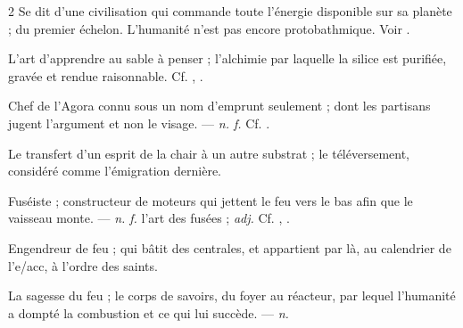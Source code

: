 \begin{multicols}{2}
 Se dit d'une civilisation qui commande toute l'énergie disponible sur sa planète ; du premier échelon. L'humanité n'est pas encore protobathmique. Voir .

 L'art d'apprendre au sable à penser ; l'alchimie par laquelle la silice est purifiée, gravée et rendue raisonnable. Cf. , .

 Chef de l'Agora connu sous un nom d'emprunt seulement ; dont les partisans jugent l'argument et non le visage.  —  \textit{n. f.} Cf. .

 Le transfert d'un esprit de la chair à un autre substrat ; le téléversement, considéré comme l'émigration dernière.

 Fuséiste ; constructeur de moteurs qui jettent le feu vers le bas afin que le vaisseau monte. —  \textit{n. f.} l'art des fusées ;  \textit{adj.} Cf. , .

 Engendreur de feu ; qui bâtit des centrales, et appartient par là, au calendrier de l'e/acc, à l'ordre des saints.

 La sagesse du feu ; le corps de savoirs, du foyer au réacteur, par lequel l'humanité a dompté la combustion et ce qui lui succède. —  \textit{n.}

\end{multicols}

